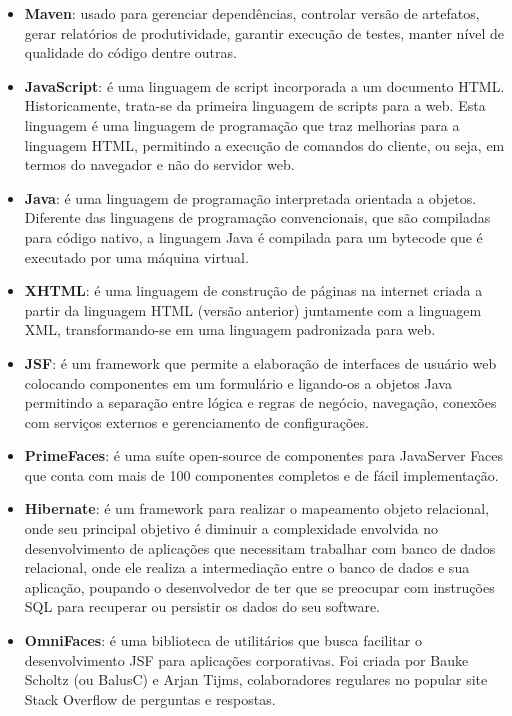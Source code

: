 \documentclass[chapter=TITLE,12pt,oneside,a4paper,english,french,sumario=tradicional,spanish,brazil,]{abntex2}
\begin{document}
\begin{itemize}
\item \textbf{Maven}: usado para gerenciar dependências, controlar versão de artefatos, gerar relatórios de produtividade, garantir execução de testes, manter nível de qualidade do código dentre outras.

\item	\textbf{JavaScript}: é uma linguagem de script incorporada a um documento HTML. Historicamente, trata-se da primeira linguagem de scripts para a web. Esta linguagem é uma linguagem de programação que traz melhorias para a linguagem HTML, permitindo a execução de comandos do cliente, ou seja, em termos do navegador e não do servidor web.

\item	\textbf{Java}: é uma linguagem de programação interpretada orientada a objetos. Diferente das linguagens de programação convencionais, que são compiladas para código nativo, a linguagem Java é compilada para um bytecode que é executado por uma máquina virtual.

\item	\textbf{XHTML}: é uma linguagem de construção de páginas na internet criada a partir da linguagem HTML (versão anterior) juntamente com a linguagem XML, transformando-se em uma linguagem padronizada para web.

\item	\textbf{JSF}: é um framework que permite a elaboração de interfaces de usuário web colocando componentes em um formulário e ligando-os a objetos Java permitindo a separação entre lógica e regras de negócio, navegação, conexões com serviços externos e gerenciamento de configurações.

\item	\textbf{PrimeFaces}: é uma suíte open-source de componentes para JavaServer Faces que conta com mais de 100 componentes completos e de fácil implementação.

\item	\textbf{Hibernate}: é um framework para realizar o mapeamento objeto relacional, onde seu principal objetivo é diminuir a complexidade envolvida no desenvolvimento de aplicações que necessitam trabalhar com banco de dados relacional, onde ele realiza a intermediação entre o banco de dados e sua aplicação, poupando o desenvolvedor de ter que se preocupar com instruções SQL para recuperar ou persistir os dados do seu software.

\item	\textbf{OmniFaces}: é uma biblioteca de utilitários que busca facilitar o desenvolvimento JSF para aplicações corporativas. Foi criada por Bauke Scholtz (ou BalusC) e Arjan Tijms, colaboradores regulares no popular site Stack Overflow de perguntas e respostas.


\end{itemize}
\end{document}
